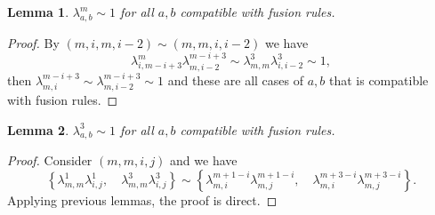 \documentclass{article}
\newtheorem{lemma}{Lemma}[section]
\newtheorem{example}[lemma]{Example}
\begin{document}







\begin{lemma}
$\lambda_{a,b}^m\sim 1$ for all $a,b$ compatible with fusion rules.
\end{lemma}
\begin{proof}
By $(m,i,m,i-2)\sim(m,m,i,i-2)$ we have
$$\lambda_{i,m-i+3}^m\lambda_{m,i-2}^{m-i+3}\sim\lambda_{m,m}^3\lambda_{i,i-2}^3\sim 1,$$
then
$\lambda_{m,i}^{m-i+3}\sim \lambda_{m,i-2}^{m-i+3}\sim 1$
and these are all cases of $a,b$ that is compatible with fusion rules.
\end{proof}
\begin{lemma}
$\lambda_{a,b}^3\sim 1$ for all $a,b$ compatible with fusion rules.
\end{lemma}
\begin{proof}
Consider $(m,m,i,j)$ and we have
$$
\left\{\lambda_{m,m}^1\lambda_{i,j}^1,\quad
\lambda_{m,m}^3\lambda_{i,j}^3\right\}
\sim
\left\{\lambda_{m,i}^{m+1-i}\lambda_{m,j}^{m+1-i},\quad
\lambda_{m,i}^{m+3-i}\lambda_{m,j}^{m+3-i}\right\}.$$
Applying previous lemmas, the proof is direct.
\end{proof}
\end{document}
